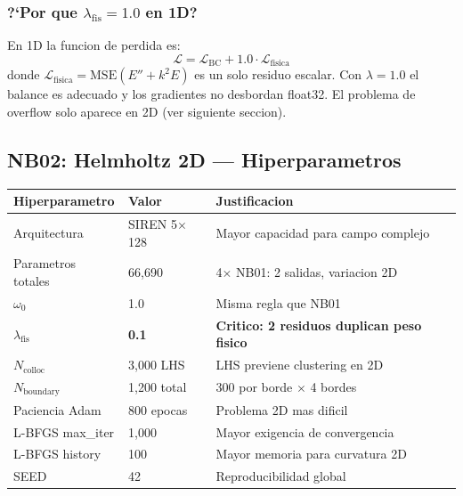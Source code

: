 \subsubsection*{?`Por que $\lambda_\text{fis} = 1.0$ en 1D?}
\begin{tcolorbox}[colback=gray!5, colframe=ujatgray, breakable]
En 1D la funcion de perdida es:
\[
  \mathcal{L} = \mathcal{L}_\text{BC} + 1.0 \cdot \mathcal{L}_\text{fisica}
\]
donde $\mathcal{L}_\text{fisica} = \text{MSE}(E'' + k^2 E)$ es un solo residuo escalar.
Con $\lambda = 1.0$ el balance es adecuado y los gradientes no desbordan float32.
El problema de overflow solo aparece en 2D (ver siguiente seccion).
\end{tcolorbox}

\vspace{10pt}

\subsection{NB02: Helmholtz 2D --- Hiperparametros}

\begin{tcolorbox}[colback=slidelightblue!30, colframe=ujatblue,
  title={\bfseries Configuracion NB02}, coltitle=white, breakable]
\begin{tabular}{@{}lll@{}}
\toprule
\textbf{Hiperparametro} & \textbf{Valor} & \textbf{Justificacion} \\
\midrule
Arquitectura & SIREN 5$\times$128 & Mayor capacidad para campo complejo \\
Parametros totales & 66,690 & 4$\times$ NB01: 2 salidas, variacion 2D \\
$\omega_0$ & 1.0 & Misma regla que NB01 \\
$\lambda_\text{fis}$ & \textbf{0.1} & \textbf{Critico: 2 residuos duplican peso fisico} \\
$N_\text{colloc}$ & 3,000 LHS & LHS previene clustering en 2D \\
$N_\text{boundary}$ & 1,200 total & 300 por borde $\times$ 4 bordes \\
Paciencia Adam & 800 epocas & Problema 2D mas dificil \\
L-BFGS max\_iter & 1,000 & Mayor exigencia de convergencia \\
L-BFGS history & 100 & Mayor memoria para curvatura 2D \\
SEED & 42 & Reproducibilidad global \\
\bottomrule
\end{tabular}
\end{tcolorbox}

